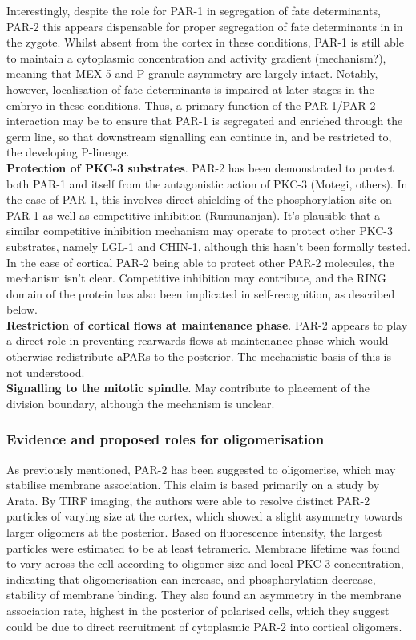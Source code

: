 \documentclass[12pt]{"article"}
\begin{document}
Interestingly, despite the role for PAR-1 in segregation of fate determinants, PAR-2 this appears dispensable for proper segregation of fate determinants in in the zygote. Whilst absent from the cortex in these conditions, PAR-1 is still able to maintain a cytoplasmic concentration and activity gradient (mechanism?), meaning that MEX-5 and P-granule asymmetry are largely intact. Notably, however, localisation of fate determinants is impaired at later stages in the embryo in these conditions. Thus, a primary function of the PAR-1/PAR-2 interaction may be to ensure that PAR-1 is segregated and enriched through the germ line, so that downstream signalling can continue in, and be restricted to, the developing P-lineage. \\

\textbf{Protection of PKC-3 substrates}. PAR-2 has been demonstrated to protect both PAR-1 and itself from the antagonistic action of PKC-3 (Motegi, others). In the case of PAR-1, this involves direct shielding of the phosphorylation site on PAR-1 as well as competitive inhibition (Rumunanjan). It’s plausible that a similar competitive inhibition mechanism may operate to protect other PKC-3 substrates, namely LGL-1 and CHIN-1, although this hasn’t been formally tested. In the case of cortical PAR-2 being able to protect other PAR-2 molecules, the mechanism isn’t clear. Competitive inhibition may contribute, and the RING domain of the protein has also been implicated in self-recognition, as described below. \\

\textbf{Restriction of cortical flows at maintenance phase}. PAR-2 appears to play a direct role in preventing rearwards flows at maintenance phase which would otherwise redistribute aPARs to the posterior. The mechanistic basis of this is not understood.\\

\textbf{Signalling to the mitotic spindle}. May contribute to placement of the division boundary, although the mechanism is unclear.\\


\subsubsection{Evidence and proposed roles for oligomerisation}

As previously mentioned, PAR-2 has been suggested to oligomerise, which may stabilise membrane association. This claim is based primarily on a study by Arata. By TIRF imaging, the authors were able to resolve distinct PAR-2 particles of varying size at the cortex, which showed a slight asymmetry towards larger oligomers at the posterior. Based on fluorescence intensity, the largest particles were estimated to be at least tetrameric. Membrane lifetime was found to vary across the cell according to oligomer size and local PKC-3 concentration, indicating that oligomerisation can increase, and phosphorylation decrease, stability of membrane binding. They also found an asymmetry in the membrane association rate, highest in the posterior of polarised cells, which they suggest could be due to direct recruitment of cytoplasmic PAR-2 into cortical oligomers.\\
\end{document}
